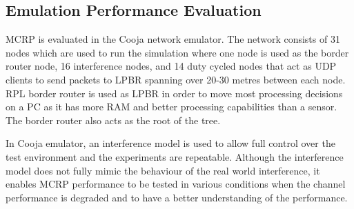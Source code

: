 \subsection{Emulation Performance Evaluation}




MCRP is evaluated in the Cooja network emulator. 
The network consists of 31 nodes which are used to run the simulation where one node is used as the border router node, 16 interference nodes, and 14 duty cycled nodes that act as UDP clients to send packets to LPBR spanning over 20-30 metres between each node. RPL border router is used as LPBR in order to move most processing decisions on a PC as it has more RAM and better processing capabilities than a sensor.
The border router also acts as the root of the tree.

In Cooja emulator, an interference model is used to allow full control over the test environment and the experiments are repeatable. Although the interference model does not fully mimic the behaviour of the real world interference, it enables MCRP performance to be tested in various conditions when the channel performance is degraded and to have a better understanding of the performance.


